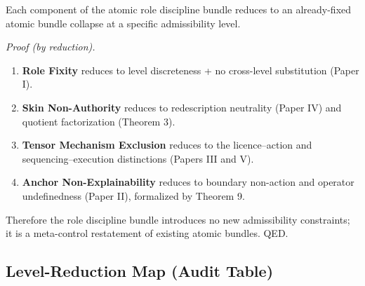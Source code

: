 \documentclass[12pt]{article}
\theoremstyle{plain}
\begin{document}
Each component of the atomic role discipline bundle reduces to an already-fixed atomic bundle collapse at a specific admissibility level.

\textit{Proof (by reduction).}
\begin{enumerate}[leftmargin=*]
\item \textbf{Role Fixity} reduces to level discreteness + no cross-level substitution (Paper I).
\item \textbf{Skin Non-Authority} reduces to redescription neutrality (Paper IV) and quotient factorization (Theorem 3).
\item \textbf{Tensor Mechanism Exclusion} reduces to the licence--action and sequencing--execution distinctions (Papers III and V).
\item \textbf{Anchor Non-Explainability} reduces to boundary non-action and operator undefinedness (Paper II), formalized by Theorem 9.
\end{enumerate}

Therefore the role discipline bundle introduces no new admissibility constraints; it is a meta-control restatement of existing atomic bundles. QED.

\subsection{Level-Reduction Map (Audit Table)}
\end{document}
